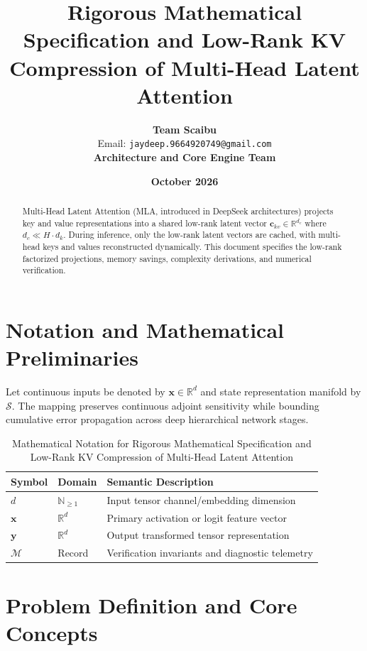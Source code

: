 \documentclass[11pt,a4paper]{article}
\title{\textbf{Rigorous Mathematical Specification and Low-Rank KV Compression of Multi-Head Latent Attention}}
\author{\textbf{Team Scaibu} \\ \small Email: \texttt{jaydeep.9664920749@gmail.com} \\ \small \textbf{Architecture and Core Engine Team}}
\date{\textbf{October 2026}}
\theoremstyle{definition}
\begin{document}
\maketitle

\begin{abstract}
Multi-Head Latent Attention (MLA, introduced in DeepSeek architectures) projects key and value representations into a shared low-rank latent vector $\mathbf{c}_{kv} \in \mathbb{R}^{d_c}$ where $d_c \ll H \cdot d_k$. During inference, only the low-rank latent vectors are cached, with multi-head keys and values reconstructed dynamically. This document specifies the low-rank factorized projections, memory savings, complexity derivations, and numerical verification.
\end{abstract}

\section{Notation and Mathematical Preliminaries}

Let continuous inputs be denoted by $\mathbf{x} \in \mathbb{R}^d$ and state representation manifold by $\mathcal{S}$. The mapping preserves continuous adjoint sensitivity while bounding cumulative error propagation across deep hierarchical network stages.

\begin{table}[h]
\centering
\caption{Mathematical Notation for Rigorous Mathematical Specification and Low-Rank KV Compression of Multi-Head Latent Attention}
\begin{tabular}{lll}
\toprule
\textbf{Symbol} & \textbf{Domain} & \textbf{Semantic Description} \\
\midrule
$d$ & $\mathbb{N}_{\ge 1}$ & Input tensor channel/embedding dimension \\
$\mathbf{x}$ & $\mathbb{R}^d$ & Primary activation or logit feature vector \\
$\mathbf{y}$ & $\mathbb{R}^d$ & Output transformed tensor representation \\
$\mathcal{M}$ & Record & Verification invariants and diagnostic telemetry \\
\bottomrule
\end{tabular}
\end{table}

\section{Problem Definition and Core Concepts}
\end{document}
